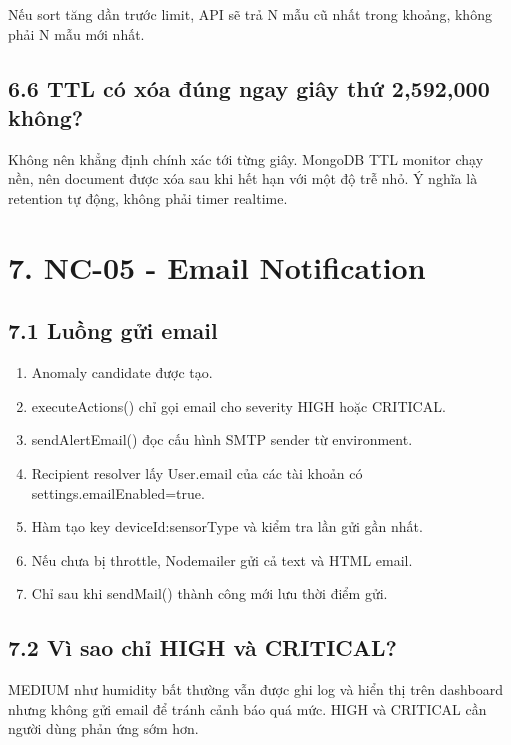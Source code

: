 \documentclass[11pt,oneside,openany]{book}
\renewcommand{\texttt}[1]{{\ttfamily\small #1}}
\providecommand{\tightlist}{\setlength{\itemsep}{1pt}\setlength{\parskip}{0pt}}
\begin{document}
Nếu sort tăng dần trước limit, API sẽ trả N mẫu cũ nhất trong khoảng,
không phải N mẫu mới nhất.

\subsection{6.6 TTL có xóa đúng ngay giây thứ 2,592,000
không?}\label{66-ttl-cuxf3-xuxf3a-ux111uxfang-ngay-giuxe2y-thux1ee9-2592000-khuxf4ng}

Không nên khẳng định chính xác tới từng giây. MongoDB TTL monitor chạy
nền, nên document được xóa sau khi hết hạn với một độ trễ nhỏ. Ý nghĩa
là retention tự động, không phải timer realtime.

\section{7. NC-05 - Email
Notification}\label{7-nc-05---email-notification}

\subsection{7.1 Luồng gửi email}\label{71-luux1ed3ng-gux1eedi-email}

\begin{enumerate}
\def\labelenumi{\arabic{enumi}.}
\tightlist
\item
  Anomaly candidate được tạo.
\item
  \texttt{executeActions()} chỉ gọi email cho severity HIGH hoặc
  CRITICAL.
\item
  \texttt{sendAlertEmail()} đọc cấu hình SMTP sender từ environment.
\item
  Recipient resolver lấy \texttt{User.email} của các tài khoản có
  \texttt{settings.emailEnabled=true}.
\item
  Hàm tạo key \texttt{deviceId:sensorType} và kiểm tra lần gửi gần nhất.
\item
  Nếu chưa bị throttle, Nodemailer gửi cả text và HTML email.
\item
  Chỉ sau khi \texttt{sendMail()} thành công mới lưu thời điểm gửi.
\end{enumerate}

\subsection{7.2 Vì sao chỉ HIGH và
CRITICAL?}\label{72-vuxec-sao-chux1ec9-high-vuxe0-critical}

MEDIUM như humidity bất thường vẫn được ghi log và hiển thị trên
dashboard nhưng không gửi email để tránh cảnh báo quá mức. HIGH và
CRITICAL cần người dùng phản ứng sớm hơn.
\end{document}
